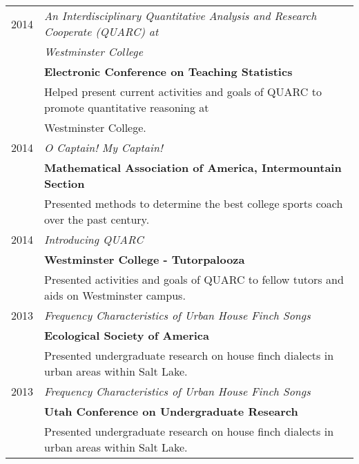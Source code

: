 \documentclass[a4paper,10pt]{article}
\begin{document}
\begin{tabular}{rl}
\textsc{2014}& \emph{An Interdisciplinary Quantitative Analysis and Research Cooperate (QUARC) at} \\
&\emph{Westminster College}
\\ & \textbf{Electronic Conference on Teaching Statistics}
\\ & \small{Helped present current activities and goals of QUARC to promote quantitative reasoning at}
\\ &\small{ Westminster College.} \\

\textsc{2014}& \emph{O Captain! My Captain!}
\\& \textbf{Mathematical Association of America, Intermountain Section}
\\& \small{Presented methods to determine the best college sports coach over
           the past century.}  \\

\textsc{2014} &\emph{Introducing QUARC}
\\& \textbf{Westminster College - Tutorpalooza}
\\& \small{Presented activities and goals of QUARC to fellow tutors and aids on
           Westminster campus.} \\

\textsc{2013}& \emph{Frequency Characteristics of Urban House Finch Songs}
\\& \textbf{Ecological Society of America}
\\& \small{Presented undergraduate research on house finch dialects in urban
           areas within Salt Lake.} \\

\textsc{2013}& \emph{Frequency Characteristics of Urban House Finch Songs}
\\& \textbf{Utah Conference on Undergraduate Research}
\\& \small{Presented undergraduate research on house finch dialects in urban
           areas within Salt Lake.}
\end{tabular}

\end{document}
